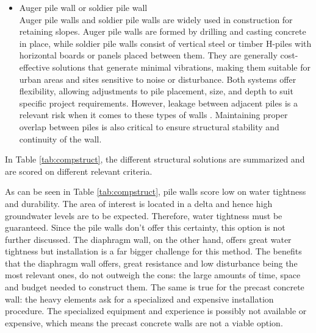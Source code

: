 \begin{itemize}
    \item Auger pile wall or soldier pile wall\\
    Auger pile walls and soldier pile walls are widely used in construction for retaining slopes. Auger pile walls are formed by drilling and casting concrete in place, while soldier pile walls consist of vertical steel or timber H-piles with horizontal boards or panels placed between them. They are generally cost-effective solutions that generate minimal vibrations, making them suitable for urban areas and sites sensitive to noise or disturbance. Both systems offer flexibility, allowing adjustments to pile placement, size, and depth to suit specific project requirements. However, leakage between adjacent piles is a relevant risk when it comes to these types of walls \autocite{korffReaderDeepExcavations2023}. Maintaining proper overlap between piles is also critical to ensure structural stability and continuity of the wall.
\end{itemize}

In Table \ref{tab:compstruct}, the different structural solutions are summarized and are scored on different relevant criteria.

\begin{table}[H]
\centering
\caption{Comparison of structural solutions}
\label{tab:compstruct}
\end{table}

As can be seen in Table \ref{tab:compstruct}, pile walls score low on water tightness and durability. The area of interest is located in a delta and hence high groundwater levels are to be expected. Therefore, water tightness must be guaranteed. Since the pile walls don't offer this certainty, this option is not further discussed. The diaphragm wall, on the other hand, offers great water tightness but installation is a far bigger challenge for this method. The benefits that the diaphragm wall offers, great resistance and low disturbance being the most relevant ones, do not outweigh the cons: the large amounts of time, space and budget needed to construct them. The same is true for the precast concrete wall: the heavy elements ask for a specialized and expensive installation procedure. The specialized equipment and experience is possibly not available or expensive, which means the precast concrete walls are not a viable option.

